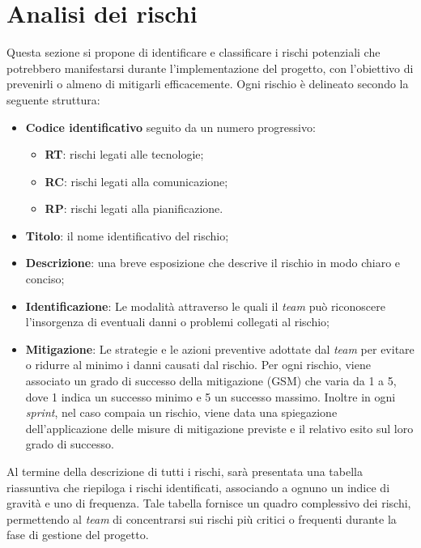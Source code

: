 \section{Analisi dei rischi}

Questa sezione si propone di identificare e classificare i rischi potenziali 
che potrebbero manifestarsi durante l'implementazione del progetto, 
con l'obiettivo di prevenirli o almeno di mitigarli efficacemente. 
Ogni rischio è delineato secondo la seguente struttura:
\begin{itemize}
	\item \textbf{Codice identificativo} seguito da un numero progressivo:
	      \begin{itemize}
		      \item \textbf{RT}: rischi legati alle tecnologie;
		      \item \textbf{RC}: rischi legati alla comunicazione;
		      \item \textbf{RP}: rischi legati alla pianificazione.
	      \end{itemize}

	\item \textbf{Titolo}: il nome identificativo del rischio;

	\item \textbf{Descrizione}: una breve esposizione che descrive il rischio in modo chiaro e conciso;

	\item \textbf{Identificazione}: Le modalità attraverso le quali il \textit{team} può riconoscere 
		l'insorgenza di eventuali danni o problemi collegati al rischio;

	\item \textbf{Mitigazione}: Le strategie e le azioni preventive adottate dal 
		\textit{team} per evitare o ridurre al minimo i danni causati dal rischio. Per ogni rischio, 
		viene associato un grado di successo della mitigazione (GSM) che varia da 1 a 5, dove 1 indica un successo minimo e 5 un successo massimo.
		Inoltre in ogni \textit{sprint}, nel caso compaia un rischio, viene data una spiegazione 
		dell'applicazione delle misure di mitigazione previste e il relativo esito sul loro grado di successo.
\end{itemize}

Al termine della descrizione di tutti i rischi, sarà presentata una tabella riassuntiva 
che riepiloga i rischi identificati, associando a ognuno un indice di gravità e uno di frequenza. 
Tale tabella fornisce un quadro complessivo dei rischi, 
permettendo al \textit{team} di concentrarsi sui rischi più critici o 
frequenti durante la fase di gestione del progetto.


